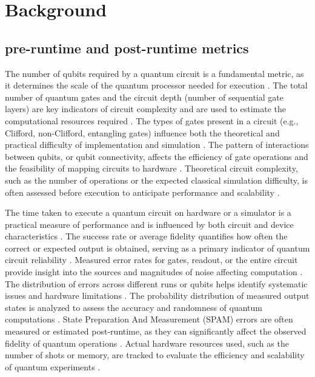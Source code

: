 \section*{Background}
\subsection*{pre-runtime and post-runtime metrics}

The number of qubits required by a quantum circuit is a fundamental metric, as it determines the scale of the quantum processor needed for execution \cite{malhotraSystematicReviewQuantum_2024-[1]}. The total number of quantum gates and the circuit depth (number of sequential gate layers) are key indicators of circuit complexity and are used to estimate the computational resources required \cite{malhotraSystematicReviewQuantum_2024-[2]}. The types of gates present in a circuit (e.g., Clifford, non-Clifford, entangling gates) influence both the theoretical and practical difficulty of implementation and simulation \cite{knillRandomizedBenchmarkingQuantum2008_2008-[3]}. The pattern of interactions between qubits, or qubit connectivity, affects the efficiency of gate operations and the feasibility of mapping circuits to hardware \cite{malhotraSystematicReviewQuantum_2024-[3]}. Theoretical circuit complexity, such as the number of operations or the expected classical simulation difficulty, is often assessed before execution to anticipate performance and scalability \cite{malhotraSystematicReviewQuantum_2024-[4]}.

The time taken to execute a quantum circuit on hardware or a simulator is a practical measure of performance and is influenced by both circuit and device characteristics \cite{malhotraSystematicReviewQuantum_2024-[5]}. The success rate or average fidelity quantifies how often the correct or expected output is obtained, serving as a primary indicator of quantum circuit reliability \cite{knillRandomizedBenchmarkingQuantum2008_2008-[4],heinrichRandomizedBenchmarkingRandom_2023-[10]}. Measured error rates for gates, readout, or the entire circuit provide insight into the sources and magnitudes of noise affecting computation \cite{knillRandomizedBenchmarkingQuantum2008_2008-[5],malhotraSystematicReviewQuantum_2024-[6]}. The distribution of errors across different runs or qubits helps identify systematic issues and hardware limitations \cite{heinrichRandomizedBenchmarkingRandom_2023-[11]}. The probability distribution of measured output states is analyzed to assess the accuracy and randomness of quantum computations \cite{heinrichRandomizedBenchmarkingRandom_2023-[12]}. State Preparation And Measurement (SPAM) errors are often measured or estimated post-runtime, as they can significantly affect the observed fidelity of quantum operations \cite{knillRandomizedBenchmarkingQuantum2008_2008-[6]}. Actual hardware resources used, such as the number of shots or memory, are tracked to evaluate the efficiency and scalability of quantum experiments \cite{malhotraSystematicReviewQuantum_2024-[7]}.

